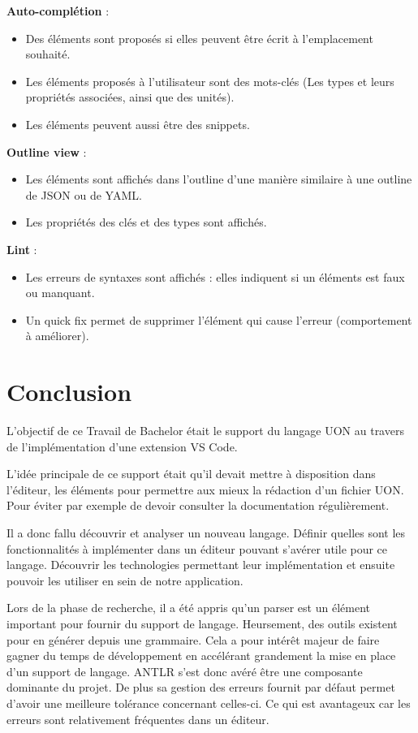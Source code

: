 \documentclass[
    iict, %
    il, %
]{heig-tb}
\begin{document}
\textbf{Auto-complétion} :
\begin{itemize}
    \item Des éléments sont proposés si elles peuvent être écrit à l'emplacement souhaité.
    \item Les éléments proposés à l'utilisateur sont des mots-clés (Les types et leurs propriétés associées, ainsi que des unités).
    \item Les éléments peuvent aussi être des snippets.
\end{itemize}

\textbf{Outline view} :
\begin{itemize}
    \item Les éléments sont affichés dans l'outline d'une manière similaire à une outline de JSON ou de YAML.
    \item Les propriétés des clés et des types sont affichés.
\end{itemize}

\textbf{Lint} :
\begin{itemize}
    \item Les erreurs de syntaxes sont affichés : elles indiquent si un éléments est faux ou manquant.
    \item Un quick fix permet de supprimer l'élément qui cause l'erreur (comportement à améliorer).
\end{itemize}

\chapter{Conclusion}

L'objectif de ce Travail de Bachelor était le support du langage UON au travers de l'implémentation d'une extension VS Code.

L'idée principale de ce support était qu'il devait mettre à disposition dans l'éditeur, les éléments pour permettre aux mieux la rédaction d'un fichier UON.
Pour éviter par exemple de devoir consulter la documentation régulièrement.

Il a donc fallu découvrir et analyser un nouveau langage.
Définir quelles sont les fonctionnalités à implémenter dans un éditeur pouvant s'avérer utile pour ce langage.
Découvrir les technologies permettant leur implémentation et ensuite pouvoir les utiliser en sein de notre application.

Lors de la phase de recherche, il a été appris qu'un parser est un élément important pour fournir du support de langage.
Heursement, des outils existent pour en générer depuis une grammaire. Cela a pour intérêt majeur de faire gagner du temps de développement en accélérant grandement la mise en place d'un support de langage.
ANTLR s'est donc avéré être une composante dominante du projet. De plus sa gestion des erreurs fournit par défaut permet d'avoir une meilleure tolérance concernant celles-ci.
Ce qui est avantageux car les erreurs sont relativement fréquentes dans un éditeur.
\end{document}
